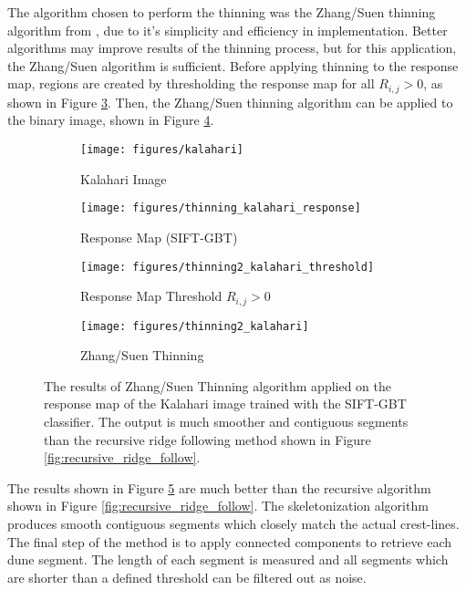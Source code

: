 The algorithm chosen to perform the thinning was the Zhang/Suen thinning algorithm from \cite{fast-parallel-algorithm-thinning}, due to it's simplicity and efficiency in implementation. Better algorithms may improve results of the thinning process, but for this application, the Zhang/Suen algorithm is sufficient. Before applying thinning to the response map, regions are created by thresholding the response map for all $R_{i,j} > 0$, as shown in Figure \ref{fig:thinning2_kalahari_threshold}. Then, the Zhang/Suen thinning algorithm can be applied to the binary image, shown in Figure \ref{fig:thinning2_kalahari}.

\begin{figure}
	\centering
	\begin{subfigure}{0.48\textwidth}
		\centering
		\texttt{[image: figures/kalahari]}
		\caption{Kalahari Image}
		\label{fig:thinning2_kalahari_input}
	\end{subfigure}
	\begin{subfigure}{0.48\textwidth}
		\centering
		\texttt{[image: figures/thinning\_kalahari\_response]}
		\caption{ Response Map (SIFT-GBT) }
		\label{fig:thinning2_kalahari_response}
	\end{subfigure}
	\begin{subfigure}{0.8\textwidth}
		\centering
		\texttt{[image: figures/thinning2\_kalahari\_threshold]}
		\caption{ Response Map Threshold $R_{i,j} > 0$ }
		\label{fig:thinning2_kalahari_threshold}
	\end{subfigure}
	\begin{subfigure}{0.8\textwidth}
		\centering
		\texttt{[image: figures/thinning2\_kalahari]}
		\caption{ Zhang/Suen Thinning \cite{fast-parallel-algorithm-thinning} }
		\label{fig:thinning2_kalahari}
	\end{subfigure}
	\caption{The results of Zhang/Suen Thinning \cite{fast-parallel-algorithm-thinning} algorithm applied on the response map of the Kalahari image trained with the SIFT-GBT classifier. The output is much smoother and contiguous segments than the recursive ridge following method shown in Figure \ref{fig:recursive_ridge_follow}. }
	\label{fig:zhang_suen_results}
\end{figure}

The results shown in Figure \ref{fig:zhang_suen_results} are much better than the recursive algorithm shown in Figure \ref{fig:recursive_ridge_follow}. The skeletonization algorithm produces smooth contiguous segments which closely match the actual crest-lines. The final step of the method is to apply connected components to retrieve each dune segment. The length of each segment is measured and all segments which are shorter than a defined threshold can be filtered out as noise. 

